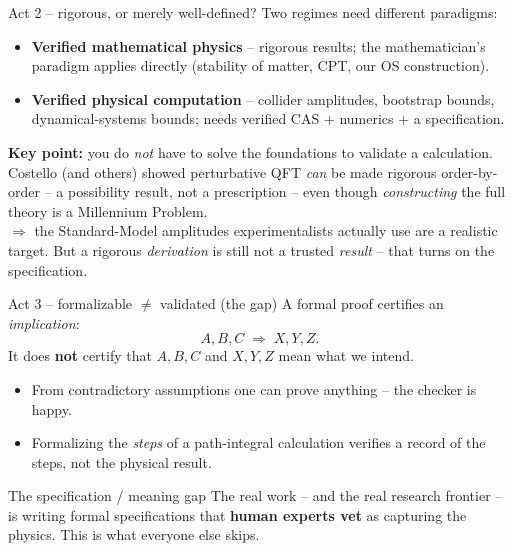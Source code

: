 \documentclass[aspectratio=169,xcolor=dvipsnames]{beamer}
\def\p{\\[0.1in] \pause}
\newcommand{\be}{\begin{equation*}}
\newcommand{\ee}{\end{equation*}}
\begin{document}
\begin{frame}{Act 2 -- rigorous, or merely well-defined?}
Two regimes need different paradigms:
\begin{itemize}
  \item \textbf{Verified mathematical physics} -- rigorous results; the mathematician's
        paradigm applies directly (stability of matter, CPT, our OS construction).
  \item \textbf{Verified physical computation} -- collider amplitudes, bootstrap bounds,
        dynamical-systems bounds; needs verified CAS + numerics + a specification.
\end{itemize} \pause
\smallskip
\textbf{Key point:} you do \emph{not} have to solve the foundations to validate a calculation.
Costello (and others) showed perturbative QFT \emph{can} be made rigorous order-by-order --
a possibility result, not a prescription -- even though \emph{constructing} the full theory
is a Millennium Problem. \p
$\Rightarrow$ the Standard-Model amplitudes experimentalists actually use are a realistic target.
\smallskip\pause
But a rigorous \emph{derivation} is still not a trusted \emph{result} -- that turns on the
specification.
\end{frame}

\begin{frame}{Act 3 -- formalizable $\ne$ validated (the gap)}
A formal proof certifies an \emph{implication}:
\be
A, B, C \;\Longrightarrow\; X, Y, Z.
\ee
It does \textbf{not} certify that $A,B,C$ and $X,Y,Z$ mean what we intend. \p
\pause
\begin{itemize}
  \item From contradictory assumptions one can prove anything -- the checker is happy.
  \item Formalizing the \emph{steps} of a path-integral calculation verifies a record of the
        steps, not the physical result.
\end{itemize} \pause
\smallskip
\begin{block}{The specification / meaning gap}
The real work -- and the real research frontier -- is writing formal specifications that
\textbf{human experts vet} as capturing the physics.  This is what everyone else skips.
\end{block}
\end{frame}
\end{document}
